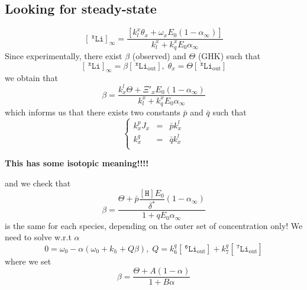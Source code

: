 \documentclass[aps,onecolumn,12pt]{revtex4}
\newcommand{\mychem}[1]{\mathtt{#1}}
\newcommand{\myconc}[1]{\left\lbrack{#1}\right\rbrack}
\newcommand{\spLi}[1]{{~^{\mychem{#1}}\mychem{Li}}}
\newcommand{\Li}[1]{\myconc{\spLi{#1}}}
\newcommand{\spLiOut}[1]{{\spLi{#1}}_{\mathrm{out}}}
\newcommand{\LiOut}[1]{\myconc{\spLiOut{#1}}}
\newcommand{\spproton}{\mychem{H}}
\newcommand{\proton}{\myconc{\spproton}}
\begin{document}
\subsection{Looking for steady-state}
\begin{equation}
	\Li{x}_\infty = \dfrac{\left\lbrack k_l^x\theta_x+\omega_x E_0 \left(1-\alpha_\infty\right)\right\rbrack}{k_l^x+ k_q^x E_0\alpha_\infty}
\end{equation}
Since experimentally, there exist $\beta$ (observed) and $\Theta$ (GHK) such that
\begin{equation}
	\Li{x}_\infty=\beta\LiOut{x},\;\theta_x = \Theta \LiOut{x}
\end{equation}
we obtain that
\begin{equation}
		\beta = \dfrac{k_x^l\Theta +\Xi'_x E_0 (1-\alpha_\infty)}{k_l^x+ k_q^x E_0\alpha_\infty}
\end{equation}
which informs us that there exists two constants $\bar{p}$ and $\bar{q}$ such that
\begin{equation}
\left\lbrace
	\begin{array}{rcl}
	k_x^p J_x & = & \bar{p} k_x^l \\
	k_x^q     & = & \bar{q} k_x^l \\
	\end{array}
\right.
\end{equation}
\centerline{\bf This has some isotopic meaning!!!!}
and we check that 
\begin{equation}
	\beta = \dfrac{\Theta + \bar{p}\dfrac{\proton E_0 }{\delta^\ast}\left(1-\alpha_\infty\right)}{1+qE_0\alpha_\infty}
\end{equation}
is the same for each species, depending on the outer set of concentration only!
We need to solve w.r.t $\alpha$
\begin{equation}
0=\omega_0-\alpha(\omega_0+k_h+Q\beta),\;Q=k_6^q \LiOut{6} + k_7^q \LiOut{7}
\end{equation}
where we set
\begin{equation}
\beta=\dfrac{\Theta+A(1-\alpha)}{1+B\alpha}
\end{equation}
\end{document}
